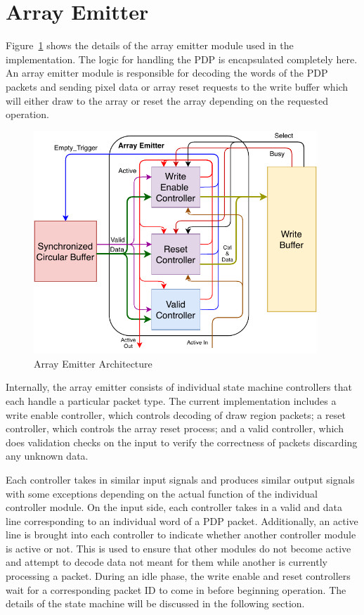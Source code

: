 \section{Array Emitter}

    Figure~\ref{fig:ae_arch} shows the details of the array emitter module used in the implementation. The logic for handling the PDP is encapsulated completely here. An array emitter module is responsible for decoding the words of the PDP packets and sending pixel data or array reset requests to the write buffer which will either draw to the array or reset the array depending on the requested operation.

    \begin{figure}[th]
        \centering
        \includegraphics[width=0.95\textwidth]{fig/pdp_ae_arch.pdf}
        \caption{Array Emitter Architecture}
        \label{fig:ae_arch}
    \end{figure}

    Internally, the array emitter consists of individual state machine controllers that each handle a particular packet type. The current implementation includes a write enable controller, which controls decoding of draw region packets; a reset controller, which controls the array reset process; and a valid controller, which does validation checks on the input to verify the correctness of packets discarding any unknown data.

    Each controller takes in similar input signals and produces similar output signals with some exceptions depending on the actual function of the individual controller module. On the input side, each controller takes in a valid and data line corresponding to an individual word of a PDP packet. Additionally, an active line is brought into each controller to indicate whether another controller module is active or not. This is used to ensure that other modules do not become active and attempt to decode data not meant for them while another is currently processing a packet. During an idle phase, the write enable and reset controllers wait for a corresponding packet ID to come in before beginning operation. The details of the state machine will be discussed in the following section.

